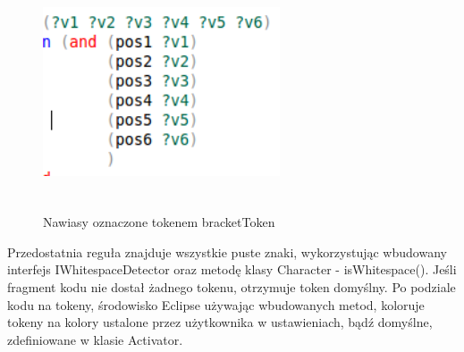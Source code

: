\begin{figure}[h]
  \centering
    \includegraphics[width=7cm,height=7cm,keepaspectratio]{img/bracket-color.png}
    \caption{Nawiasy oznaczone tokenem bracketToken}
    \label{ana_structure}
\end{figure}

Przedostatnia reguła znajduje wszystkie puste znaki, wykorzystując wbudowany interfejs  IWhitespaceDetector oraz metodę klasy Character - isWhitespace(). Jeśli fragment kodu nie dostał żadnego tokenu, otrzymuje token domyślny.  Po podziale kodu na tokeny, środowisko Eclipse używając wbudowanych metod, koloruje tokeny na kolory ustalone przez użytkownika w ustawieniach, bądź domyślne, zdefiniowane w klasie Activator.
